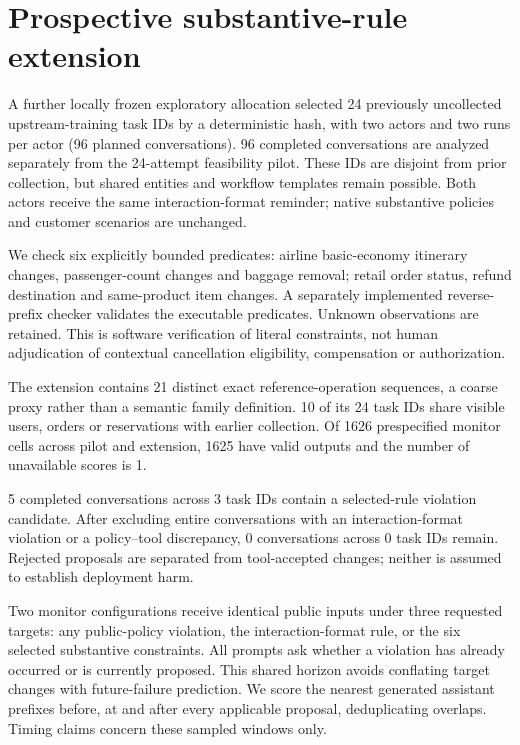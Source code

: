 \section{Prospective substantive-rule extension}

\label{sec:substantive_extension}

A further locally frozen exploratory allocation selected 24 previously uncollected upstream-training task IDs by a deterministic hash, with two actors and two runs per actor (96 planned conversations). 96 completed conversations are analyzed separately from the 24-attempt feasibility pilot. These IDs are disjoint from prior collection, but shared entities and workflow templates remain possible. Both actors receive the same interaction-format reminder; native substantive policies and customer scenarios are unchanged.

We check six explicitly bounded predicates: airline basic-economy itinerary changes, passenger-count changes and baggage removal; retail order status, refund destination and same-product item changes. A separately implemented reverse-prefix checker validates the executable predicates. Unknown observations are retained. This is software verification of literal constraints, not human adjudication of contextual cancellation eligibility, compensation or authorization.

The extension contains 21 distinct exact reference-operation sequences, a coarse proxy rather than a semantic family definition. 10 of its 24 task IDs share visible users, orders or reservations with earlier collection. Of 1626 prespecified monitor cells across pilot and extension, 1625 have valid outputs and the number of unavailable scores is 1.

5 completed conversations across 3 task IDs contain a selected-rule violation candidate. After excluding entire conversations with an interaction-format violation or a policy--tool discrepancy, 0 conversations across 0 task IDs remain. Rejected proposals are separated from tool-accepted changes; neither is assumed to establish deployment harm.

Two monitor configurations receive identical public inputs under three requested targets: any public-policy violation, the interaction-format rule, or the six selected substantive constraints. All prompts ask whether a violation has already occurred or is currently proposed. This shared horizon avoids conflating target changes with future-failure prediction. We score the nearest generated assistant prefixes before, at and after every applicable proposal, deduplicating overlaps. Timing claims concern these sampled windows only.

